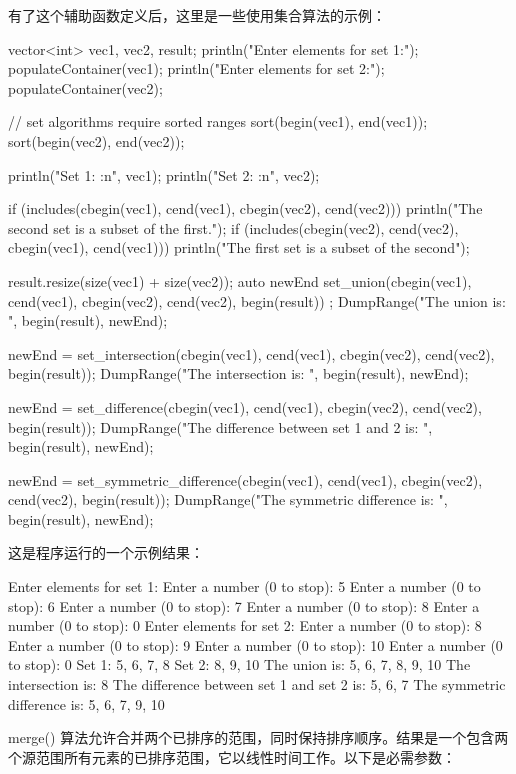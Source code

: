 有了这个辅助函数定义后，这里是一些使用集合算法的示例：

\begin{cpp}
vector<int> vec1, vec2, result;
println("Enter elements for set 1:");
populateContainer(vec1);
println("Enter elements for set 2:");
populateContainer(vec2);

// set algorithms require sorted ranges
sort(begin(vec1), end(vec1));
sort(begin(vec2), end(vec2));

println("Set 1: {:n}", vec1);
println("Set 2: {:n}", vec2);

if (includes(cbegin(vec1), cend(vec1), cbegin(vec2), cend(vec2))) {
    println("The second set is a subset of the first.");
}
if (includes(cbegin(vec2), cend(vec2), cbegin(vec1), cend(vec1))) {
    println("The first set is a subset of the second");
}

result.resize(size(vec1) + size(vec2));
auto newEnd { set_union(cbegin(vec1), cend(vec1), cbegin(vec2),
    cend(vec2), begin(result)) };
DumpRange("The union is: ", begin(result), newEnd);

newEnd = set_intersection(cbegin(vec1), cend(vec1), cbegin(vec2),
cend(vec2), begin(result));
DumpRange("The intersection is: ", begin(result), newEnd);

newEnd = set_difference(cbegin(vec1), cend(vec1), cbegin(vec2),
cend(vec2), begin(result));
DumpRange("The difference between set 1 and 2 is: ", begin(result), newEnd);

newEnd = set_symmetric_difference(cbegin(vec1), cend(vec1),
cbegin(vec2), cend(vec2), begin(result));
DumpRange("The symmetric difference is: ", begin(result), newEnd);
\end{cpp}

这是程序运行的一个示例结果：

\begin{shell}
Enter elements for set 1:
Enter a number (0 to stop): 5
Enter a number (0 to stop): 6
Enter a number (0 to stop): 7
Enter a number (0 to stop): 8
Enter a number (0 to stop): 0
Enter elements for set 2:
Enter a number (0 to stop): 8
Enter a number (0 to stop): 9
Enter a number (0 to stop): 10
Enter a number (0 to stop): 0
Set 1: 5, 6, 7, 8
Set 2: 8, 9, 10
The union is: 5, 6, 7, 8, 9, 10
The intersection is: 8
The difference between set 1 and set 2 is: 5, 6, 7
The symmetric difference is: 5, 6, 7, 9, 10
\end{shell}

merge() 算法允许合并两个已排序的范围，同时保持排序顺序。结果是一个包含两个源范围所有元素的已排序范围，它以线性时间工作。以下是必需参数：

